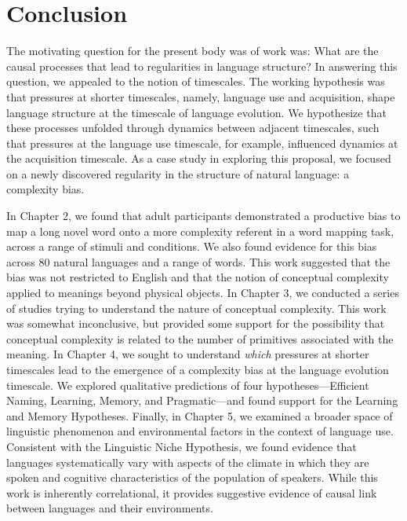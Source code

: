 
\chapter{Conclusion}
\label{chapter:conclusion}
The motivating question for the present body was of work was: What are the causal processes that lead to regularities in language structure?   In answering this question, we appealed to the notion of timescales. The working hypothesis was that pressures at shorter timescales, namely, language use and acquisition, shape language structure at the timescale of language evolution. We hypothesize that these processes unfolded through dynamics between adjacent timescales, such that pressures at the language use timescale, for example, influenced dynamics at the acquisition timescale.  As a case study in exploring this proposal, we focused on a newly discovered regularity in the structure of natural language: a complexity bias.

In Chapter 2, we found that adult participants demonstrated a productive bias to map a long novel word onto a more complexity referent in a word mapping task, across a range of stimuli and conditions. We  also found evidence for this bias across 80 natural languages and a range of words. This work suggested that  the bias was not restricted to English and that the notion of conceptual complexity applied to meanings beyond physical objects. In Chapter 3, we conducted a series of studies trying to understand the nature of conceptual complexity. This work was somewhat inconclusive, but provided some support for the possibility that conceptual complexity is related to the number of primitives associated with the meaning. In Chapter 4, we sought to understand {\it which} pressures at shorter timescales lead to the emergence of a complexity bias at the language evolution timescale. We explored qualitative predictions of four hypotheses---Efficient Naming, Learning, Memory, and Pragmatic---and found support for the Learning and Memory Hypotheses. Finally, in Chapter 5, we examined a broader space of linguistic phenomenon and environmental factors in the context of language use. Consistent with the Linguistic Niche Hypothesis, we found evidence that languages systematically vary with aspects of the climate in which they are spoken and cognitive characteristics of the population of speakers. While this work is inherently correlational, it provides suggestive evidence of causal link between languages and their environments.

